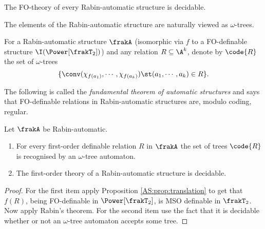 \begin{corollary}
The FO-theory of every Rabin-automatic structure is decidable.
\end{corollary}

The elements of the Rabin-automatic structure are naturally viewed as $\omega$-trees. 


\begin{definition}
For a Rabin-automatic structure $\frakA$ (isomorphic via $f$ to a FO-definable structure $\I(\Power[\frakT_2])$) and any relation $R \subseteq \A^k$, denote by
$\code{R}$ the set of $\omega$-trees 
\[\{\conv(\chi_{f(a_1)},\cdots,\chi_{f(a_k)}) \st  (a_1,\cdots,a_k) \in R\}.\]
\end{definition}

The following is called the {\em fundamental theorem of automatic structures} and says that FO-definable relations in Rabin-automatic structures are, modulo coding, regular. 

\begin{theorem} \label{AS:thm:fundthm} 
Let $\frakA$ be Rabin-automatic.
\begin{enumerate}
\item For every first-order definable relation $R$ in $\frakA$ the set of trees $\code{R}$ is recognised by an $\omega$-tree automaton.
\item The first-order theory of a Rabin-automatic structure is decidable.
\end{enumerate}
\end{theorem}

\begin{proof}
For the first item apply Proposition \ref{AS:prop:translation} to get that $f(R)$, being FO-definable in $\Power[\frakT_2]$, is 
MSO definable in $\frakT_2$. Now apply Rabin's theorem.
For the second item use the fact that it is decidable whether or not an $\omega$-tree automaton accepts some tree.
\end{proof}

